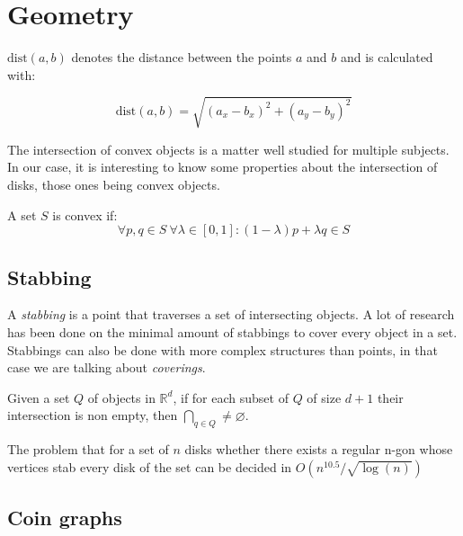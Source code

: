 \section{Geometry}
\label{sec:geom}

\begin{defn}
  $\text{dist}(a,b)$ denotes the distance between the points $a$ and $b$ and is calculated with:

  $$\text{dist}(a,b) = \sqrt{(a_x - b_x)^2 + (a_y - b_y)^2}$$
\end{defn}

The intersection of convex objects is a matter well studied for multiple
subjects. In our case, it is interesting to know some properties about
the intersection of disks, those ones being convex objects.

A set $S$ is convex if:
$$\forall p,q \in S\  \forall \lambda \in [0,1]: (1-\lambda)p + \lambda q \in S$$

\subsection{Stabbing}
A \textit{stabbing} is a point that traverses a set of intersecting objects. A lot of
research has been done \cite{schlipf2013stabbing} on the minimal amount of stabbings to
cover every object in a set. Stabbings can also be done with more complex structures
than points, in that case we are talking about \textit{coverings}.

\begin{theorem}[Helly]
  Given a set $Q$ of objects in $\mathbb{R}^d$, if for each subset of $Q$ of
  size $d+1$ their intersection is non empty, then $\bigcap_{q \in Q} \neq
  \varnothing$. \cite{Helly1923175}
\end{theorem}

\begin{theorem}
  The problem that for a set of $n$ disks whether there exists a regular n-gon
  whose vertices stab every disk of the set can be decided in $O(n^{10.5} / \sqrt{\log(n)})$ \cite{schlipf2013stabbing}
\end{theorem}

\subsection{Coin graphs}

